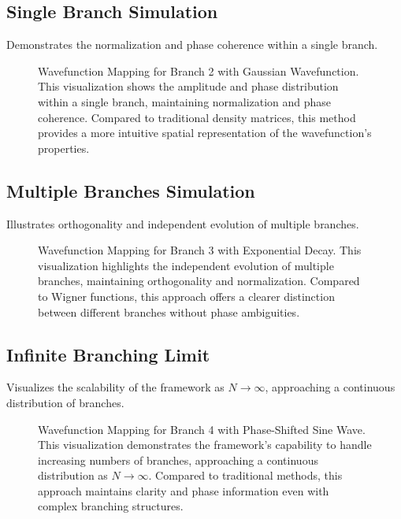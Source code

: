 \documentclass[12pt]{article}
\begin{document}
\subsection{Single Branch Simulation}
Demonstrates the normalization and phase coherence within a single branch.

\begin{figure}[h!]
    \centering
    \caption{Wavefunction Mapping for Branch 2 with Gaussian Wavefunction. This visualization shows the amplitude and phase distribution within a single branch, maintaining normalization and phase coherence. Compared to traditional density matrices, this method provides a more intuitive spatial representation of the wavefunction's properties.}
    \label{fig:gaussian_wavefunction}
\end{figure}

\subsection{Multiple Branches Simulation}
Illustrates orthogonality and independent evolution of multiple branches.

\begin{figure}[h!]
    \centering
    \caption{Wavefunction Mapping for Branch 3 with Exponential Decay. This visualization highlights the independent evolution of multiple branches, maintaining orthogonality and normalization. Compared to Wigner functions, this approach offers a clearer distinction between different branches without phase ambiguities.}
    \label{fig:exponential_wavefunction}
\end{figure}

\subsection{Infinite Branching Limit}
Visualizes the scalability of the framework as \(N \rightarrow \infty\), approaching a continuous distribution of branches.

\begin{figure}[h!]
    \centering
    \caption{Wavefunction Mapping for Branch 4 with Phase-Shifted Sine Wave. This visualization demonstrates the framework's capability to handle increasing numbers of branches, approaching a continuous distribution as \(N \rightarrow \infty\). Compared to traditional methods, this approach maintains clarity and phase information even with complex branching structures.}
    \label{fig:sine_wavefunction}
\end{figure}
\end{document}
